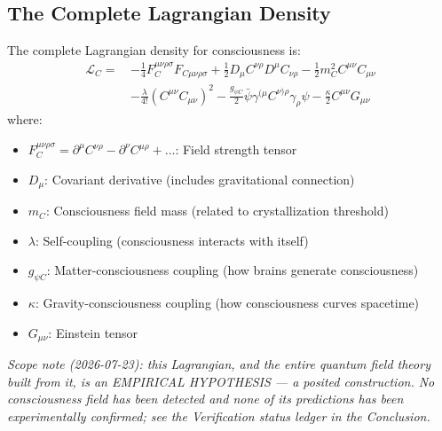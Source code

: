 \subsection{The Complete Lagrangian Density}

\begin{defn}\label{def:consciousness-lagrangian}
The complete Lagrangian density for consciousness is:
\begin{equation}
\boxed{
\begin{aligned}
\mathcal{L}_C =\, & -\frac{1}{4}F^{\mu\nu\rho\sigma}_C F_{C\mu\nu\rho\sigma} + \frac{1}{2}D_\mu C^{\nu\rho} D^\mu C_{\nu\rho} - \frac{1}{2}m_C^2 C^{\mu\nu}C_{\mu\nu}\\
& -\frac{\lambda}{4!}(C^{\mu\nu}C_{\mu\nu})^2 - \frac{g_{\psi C}}{2}\bar{\psi}\gamma^{(\mu}C^{\nu)\rho}\gamma_\rho\psi - \frac{\kappa}{2}C^{\mu\nu}G_{\mu\nu}
\end{aligned}
}
\end{equation}
where:
\begin{itemize}
\item $F^{\mu\nu\rho\sigma}_C = \partial^\mu C^{\nu\rho} - \partial^\nu C^{\mu\rho} + \ldots$: Field strength tensor
\item $D_\mu$: Covariant derivative (includes gravitational connection)
\item $m_C$: Consciousness field mass (related to crystallization threshold)
\item $\lambda$: Self-coupling (consciousness interacts with itself)
\item $g_{\psi C}$: Matter-consciousness coupling (how brains generate consciousness)
\item $\kappa$: Gravity-consciousness coupling (how consciousness curves spacetime)
\item $G_{\mu\nu}$: Einstein tensor
\end{itemize}
\end{defn}

\noindent\emph{Scope note (2026-07-23): this Lagrangian, and the entire quantum field theory built from it, is an EMPIRICAL HYPOTHESIS --- a posited construction. No consciousness field has been detected and none of its predictions has been experimentally confirmed; see the Verification status ledger in the Conclusion.}


